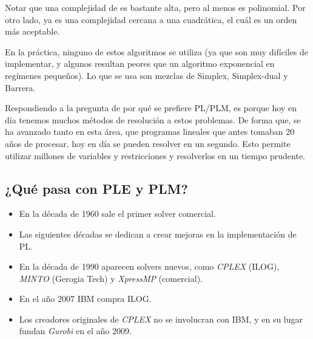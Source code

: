 \begin{obs}
Notar que una complejidad de \Ord[n^6 L] es bastante alta, pero al menos es polinomial. Por otro lado, \Ord[n^{2,37} L] ya es una complejidad cercana a una cuadrática, el cuál es un orden más aceptable.
\end{obs}

\begin{obs}
En la práctica, ninguno de estos algoritmos se utiliza (ya que son muy difíciles de implementar, y algunos resultan peores que un algoritmo exponencial en regímenes pequeños). Lo que se usa son mezclas de Simplex, Simplex-dual y Barrera.
\end{obs}

Respondiendo a la pregunta de por qué se prefiere PL/PLM, es porque hoy en día tenemos muchos métodos de resolución a estos problemas. De forma que, se ha avanzado tanto en esta área, que programas lineales que antes tomaban 20 años de procesar, hoy en día se pueden resolver en un segundo. Esto permite utilizar millones de variables y restricciones y resolverlos en un tiempo prudente.

\subsection*{¿Qué pasa con PLE y PLM?}
\begin{itemize}
    \item En la década de 1960 sale el primer solver comercial.
    \item Las siguientes décadas se dedican a crear mejoras en la implementación de PL.
    \item En la década de 1990 aparecen solvers nuevos, como \textit{CPLEX} (ILOG), \textit{MINTO} (Gerogia Tech) y \textit{XpressMP} (comercial).
    \item En el año 2007 IBM compra ILOG.
    \item Los creadores originales de \textit{CPLEX} no se involucran con IBM, y en su lugar fundan \textit{Gurobi} en el año 2009.
\end{itemize}

